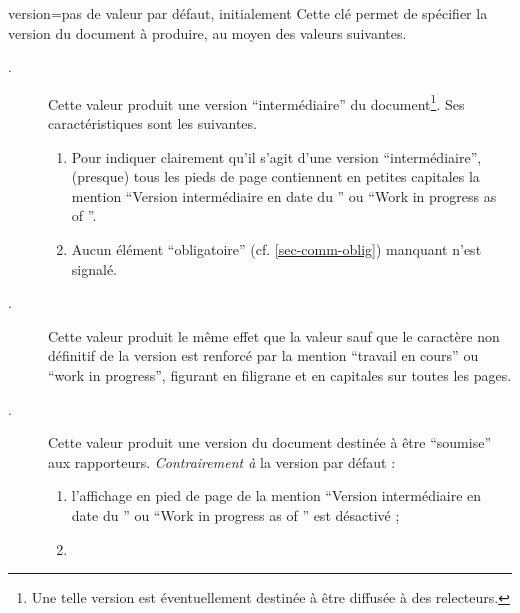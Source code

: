 {
  \begin{docKey}{version}{=\textbar{}\textbar{}\textbar{}\textbar{}\textbar{}}{pas
      de valeur par défaut, initialement }
    Cette clé permet de spécifier la version du document à produire, au moyen
    des valeurs suivantes.
    \begin{description}
    \item[.] Cette valeur produit une version
      \enquote{intermédiaire} du document\footnote{Une telle version est
        éventuellement destinée à être diffusée à des relecteurs.}. Ses
      caractéristiques sont les suivantes.
      \begin{enumerate}
      \item\label{item:inprogress:1} Pour indiquer clairement qu'il s'agit d'une
        version \enquote{intermédiaire}, (presque) tous les pieds de page
        contiennent en petites capitales la mention \enquote{Version
          intermédiaire en date du } ou
        \foreignquote{english}{Work in progress as of }\selonlangue{}.
      \item\label{item:inprogress:2} Aucun élément \enquote{obligatoire}
        (cf. \vref{sec-comm-oblig}) manquant n'est signalé.
      \end{enumerate}
    \item[.] Cette valeur produit le même effet que la
      valeur  sauf que le caractère non définitif de la
      version est renforcé par la mention \enquote{travail en cours} ou
      \foreignquote{english}{work in progress}\selonlangue{}, figurant en
      filigrane et en capitales sur toutes les pages.
    \item[.] Cette valeur produit une version du document
      destinée à être \enquote{soumise} aux rapporteurs. \emph{Contrairement à}
      la version par défaut :
      \begin{enumerate}
      \item l'affichage en pied de page de la mention \enquote{Version
          intermédiaire en date du } ou
        \foreignquote{english}{Work in progress as of } est
        désactivé ;
      \item {}
\end{enumerate}
\end{description}
\end{docKey}}
